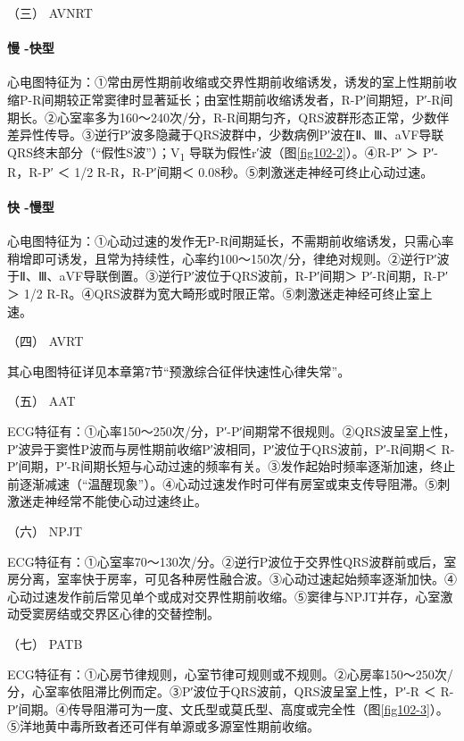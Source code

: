 \hypertarget{text00289.htmlux5cux23CHP10-2-2-2-2-3}{}
（三） AVNRT

\paragraph{慢 -快型}

心电图特征为：①常由房性期前收缩或交界性期前收缩诱发，诱发的室上性期前收缩P-R间期较正常窦律时显著延长；由室性期前收缩诱发者，R-P′间期短，P′-R间期长。②心室率多为160～240次/分，R-R间期匀齐，QRS波群形态正常，少数伴差异性传导。③逆行P′波多隐藏于QRS波群中，少数病例P′波在Ⅱ、Ⅲ、aVF导联QRS终末部分（“假性S波”）；V\textsubscript{1}
导联为假性r′波（图\ref{fig102-2}）。④R-P′ ＞ P′-R，R-P′ ＜ 1/2 R-R，R-P′间期＜
0.08秒。⑤刺激迷走神经可终止心动过速。

\paragraph{快 -慢型}

心电图特征为：①心动过速的发作无P-R间期延长，不需期前收缩诱发，只需心率稍增即可诱发，且常为持续性，心率约100～150次/分，律绝对规则。②逆行P′波于Ⅱ、Ⅲ、aVF导联倒置。③逆行P′波位于QRS波前，R-P′间期＞
P′-R间期，R-P′ ＞ 1/2
R-R。④QRS波群为宽大畸形或时限正常。⑤刺激迷走神经可终止室上速。

\hypertarget{text00289.htmlux5cux23CHP10-2-2-2-2-4}{}
（四） AVRT

其心电图特征详见本章第7节“预激综合征伴快速性心律失常”。

\hypertarget{text00289.htmlux5cux23CHP10-2-2-2-2-5}{}
（五） AAT

ECG特征有：①心率150～250次/分，P′-P′间期常不很规则。②QRS波呈室上性，P′波异于窦性P波而与房性期前收缩P′波相同，P′波位于QRS波前，P′-R间期＜
R-P′间期，P′-R间期长短与心动过速的频率有关。③发作起始时频率逐渐加速，终止前逐渐减速（“温醒现象”）。④心动过速发作时可伴有房室或束支传导阻滞。⑤刺激迷走神经常不能使心动过速终止。

\hypertarget{text00289.htmlux5cux23CHP10-2-2-2-2-6}{}
（六） NPJT

ECG特征有：①心室率70～130次/分。②逆行P波位于交界性QRS波群前或后，室房分离，室率快于房率，可见各种房性融合波。③心动过速起始频率逐渐加快。④心动过速发作前后常见单个或成对交界性期前收缩。⑤窦律与NPJT并存，心室激动受窦房结或交界区心律的交替控制。

\hypertarget{text00289.htmlux5cux23CHP10-2-2-2-2-7}{}
（七） PATB

ECG特征有：①心房节律规则，心室节律可规则或不规则。②心房率150～250次/分，心室率依阻滞比例而定。③P′波位于QRS波前，QRS波呈室上性，P′-R
＜
R-P′间期。④传导阻滞可为一度、文氏型或莫氏型、高度或完全性（图\ref{fig102-3}）。⑤洋地黄中毒所致者还可伴有单源或多源室性期前收缩。

